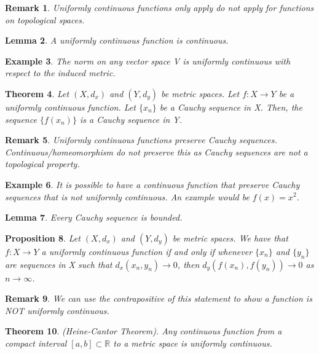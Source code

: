 \documentclass[twoside]{article}
\newcounter{lecnum}
\newtheorem{theorem}{Theorem}[lecnum]
\newtheorem{lemma}[theorem]{Lemma}
\newtheorem{proposition}[theorem]{Proposition}
\newtheorem{remark}[theorem]{Remark}
\newtheorem{example}[theorem]{Example}
\begin{document}
\begin{remark} Uniformly continuous functions only apply do not apply for functions on topological spaces.
\end{remark}

\begin{lemma}A uniformly continuous function is continuous.
\end{lemma}

\begin{example} The norm on any vector space V is uniformly continuous with respect to the induced metric.
\end{example}

\begin{theorem}Let $(X, d_x)$ and $(Y, d_y)$ be metric spaces. Let $f:X \rightarrow Y$ be a uniformly continuous function. Let $\{x_n\}$ be a Cauchy sequence in X. Then, the sequence $\{f(x_n)\}$ is a Cauchy sequence in Y.
\end{theorem}

\begin{remark}Uniformly continuous functions preserve Cauchy sequences. Continuous/homeomorphism do not preserve this as Cauchy sequences are not a topological property.
\end{remark}

\begin{example} It is possible to have a continuous function that preserve Cauchy sequences that is not uniformly continuous. An example would be $f(x) = x^2$.
\end{example}

\begin{lemma}Every Cauchy sequence is bounded.
\end{lemma}

\begin{proposition}Let $(X,d_x)$ and $(Y,d_y)$ be metric spaces. We have that $f:X \rightarrow Y$ a uniformly continuous function if and only if whenever $\{x_n\}$ and $\{y_n\}$ are sequences in X such that $d_x(x_n,y_n) \rightarrow 0$, then $d_y(f(x_n), f(y_n)) \rightarrow 0$ as $n \rightarrow \infty$. 
\end{proposition}

\begin{remark}We can use the contrapositive of this statement to show a function is NOT uniformly continuous.
\end{remark}

\begin{theorem}(Heine-Cantor Theorem). Any continuous function from a compact interval $[a,b] \subset \mathbb{R}$ to a metric space is uniformly continuous.
\end{theorem}
\end{document}
